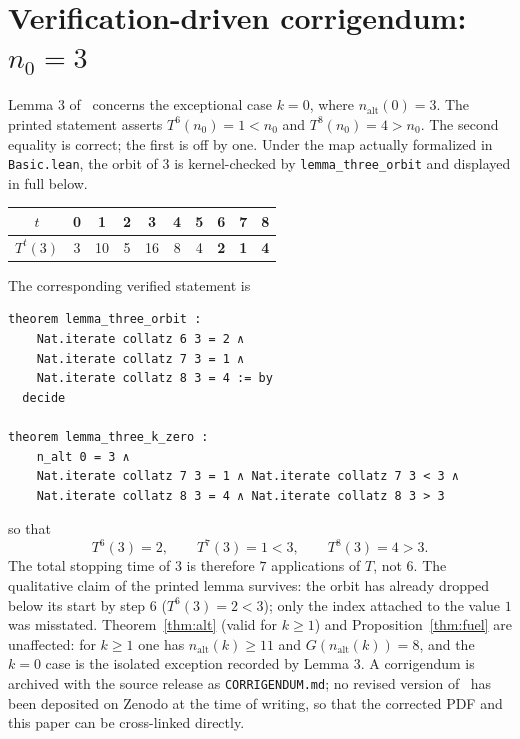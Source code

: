 \documentclass[11pt,a4paper]{article}
\begin{document}
\section{Verification-driven corrigendum: \texorpdfstring{$n_{0}=3$}{n0 = 3}}
\label{sec:corrigendum}

Lemma 3 of~\cite{paper2} concerns the exceptional case $k=0$, where
$n_{\mathrm{alt}}(0)=3$.  The printed statement asserts
$T^{6}(n_{0})=1<n_{0}$ and $T^{8}(n_{0})=4>n_{0}$.  The second equality is
correct; the first is off by one.  Under the map actually formalized in
\texttt{Basic.lean}, the orbit of $3$ is kernel-checked by
\texttt{lemma\_three\_orbit} and displayed in full below.

\begin{center}
\begin{tabular}{@{}cccccccccc@{}}
\toprule
$t$ & 0 & 1 & 2 & 3 & 4 & 5 & 6 & 7 & 8 \\
\midrule
$T^{t}(3)$ & 3 & 10 & 5 & 16 & 8 & 4 & \textbf{2} & \textbf{1} & \textbf{4} \\
\bottomrule
\end{tabular}
\end{center}

\noindent The corresponding verified statement is

\begin{lstlisting}
theorem lemma_three_orbit :
    Nat.iterate collatz 6 3 = 2 ∧
    Nat.iterate collatz 7 3 = 1 ∧
    Nat.iterate collatz 8 3 = 4 := by
  decide

theorem lemma_three_k_zero :
    n_alt 0 = 3 ∧
    Nat.iterate collatz 7 3 = 1 ∧ Nat.iterate collatz 7 3 < 3 ∧
    Nat.iterate collatz 8 3 = 4 ∧ Nat.iterate collatz 8 3 > 3
\end{lstlisting}

so that
\[
  T^{6}(3)=2,\qquad T^{7}(3)=1<3,\qquad T^{8}(3)=4>3 .
\]
The total stopping time of $3$ is therefore $7$ applications of $T$, not $6$.
The qualitative claim of the printed lemma survives: the orbit has already
dropped below its start by step $6$ ($T^{6}(3)=2<3$); only the index attached to
the value $1$ was misstated.  Theorem~\ref{thm:alt} (valid for $k\ge 1$) and
Proposition~\ref{thm:fuel} are unaffected: for $k\ge 1$ one has
$n_{\mathrm{alt}}(k)\ge 11$ and $G(n_{\mathrm{alt}}(k))=8$, and the $k=0$ case is
the isolated exception recorded by Lemma 3.  A corrigendum is archived with the
source release as \texttt{CORRIGENDUM.md}; no revised version of~\cite{paper2}
has been deposited on Zenodo at the time of writing, so that the corrected PDF
and this paper can be cross-linked directly.
\end{document}
